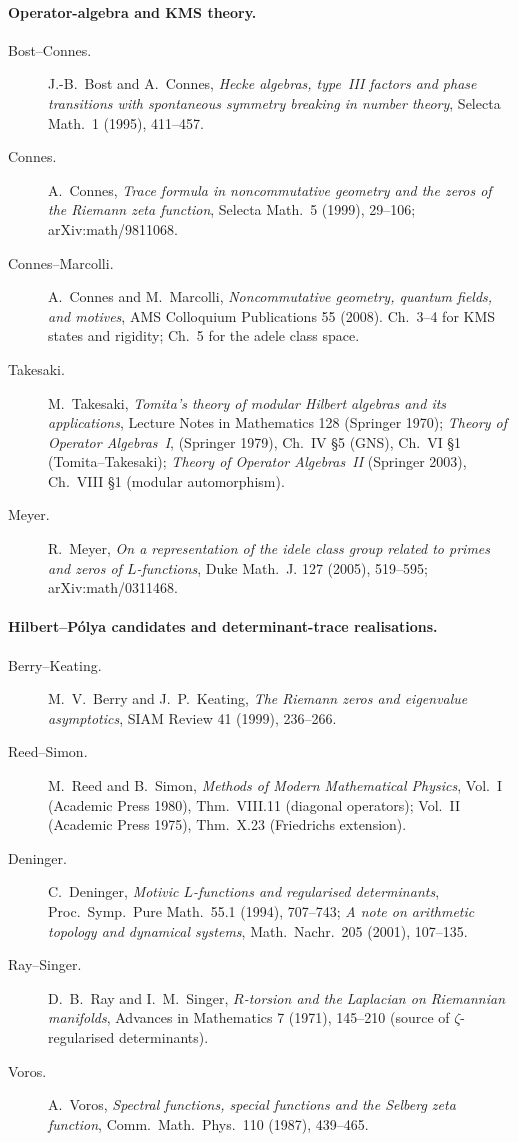 \paragraph{Operator-algebra and KMS theory.}
\begin{description}
\item[Bost--Connes.] J.-B.~Bost and A.~Connes, \emph{Hecke algebras,
type~III factors and phase transitions with spontaneous symmetry
breaking in number theory}, Selecta Math.~1 (1995), 411--457.
\item[Connes.] A.~Connes, \emph{Trace formula in noncommutative
geometry and the zeros of the Riemann zeta function}, Selecta
Math.~5 (1999), 29--106; arXiv:math/9811068.
\item[Connes--Marcolli.] A.~Connes and M.~Marcolli, \emph{Noncommutative
geometry, quantum fields, and motives}, AMS Colloquium Publications
55 (2008). Ch.~3--4 for KMS states and rigidity; Ch.~5 for the
adele class space.
\item[Takesaki.] M.~Takesaki, \emph{Tomita's theory of modular
Hilbert algebras and its applications}, Lecture Notes in Mathematics
128 (Springer 1970); \emph{Theory of Operator Algebras~I}, (Springer
1979), Ch.~IV \S5 (GNS), Ch.~VI \S1 (Tomita--Takesaki); \emph{Theory
of Operator Algebras~II} (Springer 2003), Ch.~VIII \S1 (modular
automorphism).
\item[Meyer.] R.~Meyer, \emph{On a representation of the idele class
group related to primes and zeros of \(L\)-functions}, Duke Math.~J.
127 (2005), 519--595; arXiv:math/0311468.
\end{description}

	\paragraph{Hilbert--P\'olya candidates and determinant-trace realisations.}
\begin{description}
\item[Berry--Keating.] M.~V.~Berry and J.~P.~Keating, \emph{The
Riemann zeros and eigenvalue asymptotics}, SIAM Review 41 (1999),
236--266.
\item[Reed--Simon.] M.~Reed and B.~Simon, \emph{Methods of Modern
Mathematical Physics}, Vol.~I (Academic Press 1980),
Thm.~VIII.11 (diagonal operators); Vol.~II (Academic Press 1975),
Thm.~X.23 (Friedrichs extension).
\item[Deninger.] C.~Deninger, \emph{Motivic \(L\)-functions and
regularised determinants}, Proc.~Symp.~Pure Math.~55.1 (1994),
707--743; \emph{A note on arithmetic topology and dynamical systems},
Math.~Nachr.~205 (2001), 107--135.
\item[Ray--Singer.] D.~B.~Ray and I.~M.~Singer, \emph{\(R\)-torsion
and the Laplacian on Riemannian manifolds}, Advances in
Mathematics 7 (1971), 145--210 (source of \(\zeta\)-regularised
determinants).
\item[Voros.] A.~Voros, \emph{Spectral functions, special functions
and the Selberg zeta function}, Comm.~Math.~Phys.~110 (1987),
439--465.
\end{description}


